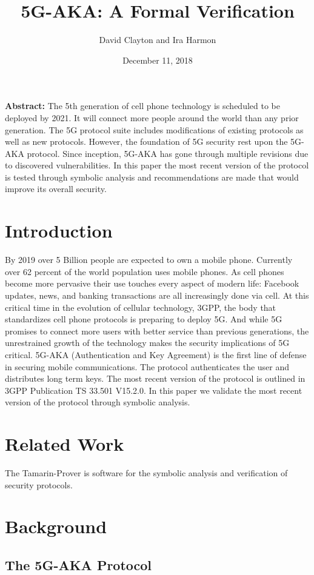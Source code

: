 \documentclass[10pt, pdftex]{article}
\title{5G-AKA: A Formal Verification}
\author{David Clayton and Ira Harmon}
\date{December 11, 2018}
\begin{document}
\maketitle
\textbf{Abstract:} 
The 5th generation of cell phone technology is scheduled to be deployed by 2021.  It will connect more people around the world than any prior generation.  The 5G protocol suite includes modifications of existing protocols as well as new protocols.  However, the foundation of 5G security rest upon the 5G-AKA protocol.  Since inception, 5G-AKA has gone through multiple revisions due to discovered vulnerabilities.  In this paper the most recent version of the protocol is tested through symbolic analysis and recommendations are made that would improve its overall security.

\newpage
\section{Introduction}
By 2019 over 5 Billion people are expected to own a mobile phone.  Currently over 62 percent of the world population uses mobile phones.  As cell phones become more pervasive their use touches every aspect of modern life: Facebook updates, news, and banking transactions are all increasingly done via cell.  At this critical time in the evolution of cellular technology, 3GPP, the body that standardizes cell phone protocols is preparing to deploy 5G.  And while 5G promises to connect more users with better service than previous generations, the unrestrained growth of the technology makes the security implications of 5G critical.  5G-AKA (Authentication and Key Agreement) is the first line of defense in securing mobile communications.  The protocol authenticates the user and distributes long term keys.  The most recent version of the protocol is outlined in 3GPP Publication TS 33.501 V15.2.0.  In this paper we validate the most recent version of the protocol through symbolic analysis.  

\section{Related Work}
The Tamarin-Prover is software for the symbolic analysis and verification of security protocols.


\section{Background}
\subsection{The 5G-AKA Protocol}
\end{document}
